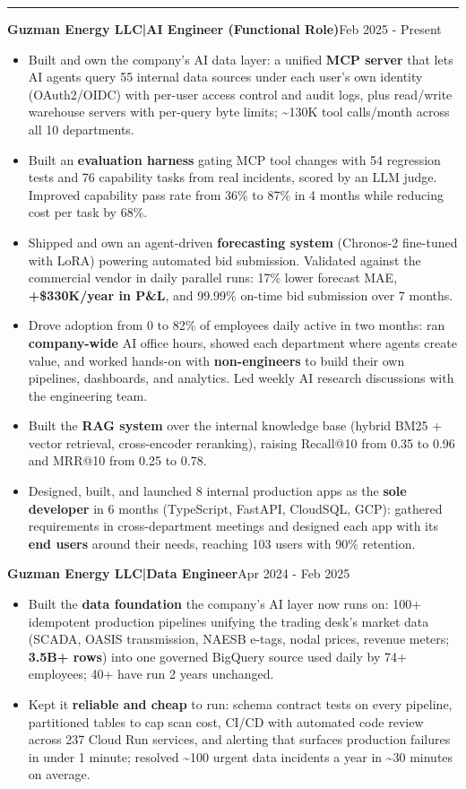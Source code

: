 \documentclass[letterpaper]{article}
\newcommand{\sep}{\enspace|\enspace}
\newcommand{\name}[1]{{\bfseries#1}}
\newcommand{\when}[1]{\hfill#1\par}
\newcommand{\heading}[1]{\addvspace{4.5bp}{\fontsize{11bp}{13bp}\selectfont\bfseries#1\par}
  \vspace{3.5bp}\hrule\vspace{5bp}}
\begin{document}
\heading{WORK EXPERIENCE}
\name{Guzman Energy LLC\sep AI Engineer (Functional Role)}\when{Feb 2025 - Present}
\begin{itemize}
  \item Built and own the company's AI data layer: a unified \textbf{MCP server} that lets AI agents query 55 internal data sources under each user's own identity (OAuth2/OIDC) with per-user access control and audit logs, plus read/write warehouse servers with per-query byte limits; \textasciitilde{}130K tool calls/month across all 10 departments.
  \item Built an \textbf{evaluation harness} gating MCP tool changes with 54 regression tests and 76 capability tasks from real incidents, scored by an LLM judge. Improved capability pass rate from 36\% to 87\% in 4 months while reducing cost per task by 68\%.
  \item Shipped and own an agent-driven \textbf{forecasting system} (Chronos-2 fine-tuned with LoRA) powering automated bid submission. Validated against the commercial vendor in daily parallel runs: 17\% lower forecast MAE, \textbf{+\$330K/year in P\&L}, and 99.99\% on-time bid submission over 7 months.
  \item Drove adoption from 0 to 82\% of employees daily active in two months: ran \textbf{company-wide} AI office hours, showed each department where agents create value, and worked hands-on with \textbf{non-engineers} to build their own pipelines, dashboards, and analytics. Led weekly AI research discussions with the engineering team.
  \item Built the \textbf{RAG system} over the internal knowledge base (hybrid BM25 + vector retrieval, cross-encoder reranking), raising Recall@10 from 0.35 to 0.96 and MRR@10 from 0.25 to 0.78.
  \item Designed, built, and launched 8 internal production apps as the \textbf{sole developer} in 6 months (TypeScript, FastAPI, CloudSQL, GCP): gathered requirements in cross-department meetings and designed each app with its \textbf{end users} around their needs, reaching 103 users with 90\% retention.
\end{itemize}
\name{Guzman Energy LLC\sep Data Engineer}\when{Apr 2024 - Feb 2025}
\begin{itemize}
  \item Built the \textbf{data foundation} the company's AI layer now runs on: 100+ idempotent production pipelines unifying the trading desk's market data (SCADA, OASIS transmission, NAESB e-tags, nodal prices, revenue meters; \textbf{3.5B+ rows}) into one governed BigQuery source used daily by 74+ employees; 40+ have run 2 years unchanged.
  \item Kept it \textbf{reliable and cheap} to run: schema contract tests on every pipeline, partitioned tables to cap scan cost, CI/CD with automated code review across 237 Cloud Run services, and alerting that surfaces production failures in under 1 minute; resolved \textasciitilde{}100 urgent data incidents a year in \textasciitilde{}30 minutes on average.
\end{itemize}
\end{document}
